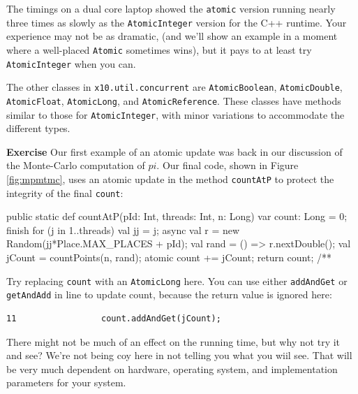 The timings on a dual core laptop showed the {\tt atomic} version running nearly
three times as slowly as the {\tt AtomicInteger} version 
for the C++ runtime.  Your experience may not be as dramatic,
(and we'll show an example in a moment where a well-placed {\tt Atomic} sometimes wins),
but it pays to at least try {\tt AtomicInteger} when you can.

The other classes in {\tt x10.util.concurrent} are {\tt AtomicBoolean}, 
{\tt AtomicDouble}, {\tt AtomicFloat}, {\tt AtomicLong}, and
{\tt AtomicReference}.  These classes have methods similar to those for
{\tt AtomicInteger}, with minor variations to accommodate the different
types.

{\bf Exercise}  Our first example of an atomic update was back in
our discussion of the Monte-Carlo computation of $pi$.  Our final code,
shown in Figure \ref{fig:mpmtmc}, uses an atomic update in the
method {\tt countAtP} to protect the integrity of the final {\tt count}:
\begin{xtennum}[]
    public static def countAtP(pId: Int, threads: Int, n: Long) {
        var count: Long = 0;
        finish for (j in 1..threads)  {
            val jj = j;
            async {
                val r = new Random(jj*Place.MAX_PLACES + pId);
                val rand = () => r.nextDouble();
                val jCount = countPoints(n, rand);
                atomic count += jCount;
            }
        }
        return count;
    }
    /**
\end{xtennum}
Try replacing {\tt count} with an {\tt AtomicLong} here.  You can use 
either {\tt addAndGet} or {\tt getAndAdd} in line 
to update count, because the return value is ignored here:
\begin{verbatim}
11                 count.addAndGet(jCount);
\end{verbatim}
There might not be much of an effect on the running time, but why not try it
and see?  We're not being coy here in not telling you what you wiil
see.  That will be very much dependent
on hardware, operating system, and implementation parameters for your system.

